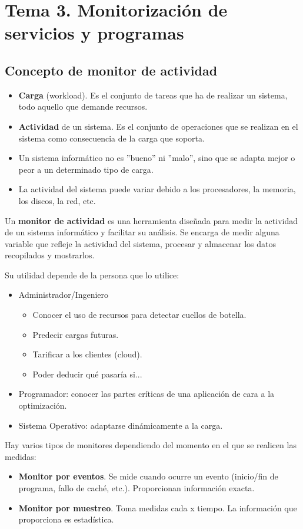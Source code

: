 \documentclass[12pt,spanish]{article}
\begin{document}
\section{Tema 3. Monitorización de servicios y programas}

\subsection{Concepto de monitor de actividad}
\begin{itemize}
	\item \textbf{Carga} (workload). Es el conjunto de tareas que ha de realizar un sistema, todo aquello que demande recursos.
	\item \textbf{Actividad} de un sistema. Es el conjunto de operaciones que se realizan en el sistema como consecuencia de la carga que soporta.
	\item Un sistema informático no es ''bueno'' ni ''malo'', sino que se adapta mejor o peor a un determinado tipo de carga.
	\item La actividad del sistema puede variar debido a los procesadores, la memoria, los discos, la red, etc.
\end{itemize}

Un \textbf{monitor de actividad} es una herramienta diseñada para medir la actividad de un sistema informático y facilitar su análisis. Se encarga de medir alguna variable que refleje la actividad del sistema, procesar y almacenar los datos recopilados y mostrarlos.

Su utilidad depende de la persona que lo utilice:
\begin{itemize}
	\item Administrador/Ingeniero
	\begin{itemize}
		\item Conocer el uso de recursos para detectar cuellos de botella.
		\item Predecir cargas futuras.
		\item Tarificar a los clientes (cloud).
		\item Poder deducir qué pasaría si...
	\end{itemize}
	\item Programador: conocer las partes críticas de una aplicación de cara a la optimización.
	\item Sistema Operativo: adaptarse dinámicamente a la carga.
\end{itemize}

Hay varios tipos de monitores dependiendo del momento en el que se realicen las medidas:
\begin{itemize}
	\item \textbf{Monitor por eventos}. Se mide cuando ocurre un evento (inicio/fin de programa, fallo de caché, etc.). Proporcionan información exacta.
	\item \textbf{Monitor por muestreo}. Toma medidas cada x tiempo. La información que proporciona es estadística.
\end{itemize}
\end{document}
